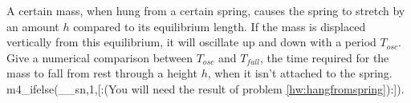         A certain mass, when hung from a certain spring, causes the spring to stretch
        by an amount $h$ compared to its equilibrium length.
        If the mass is displaced vertically from this equilibrium, it will oscillate
        up and down with a period $T_{osc}$. Give a numerical comparison between
        $T_{osc}$ and $T_{fall}$, the time required for the mass to fall from rest
        through a height $h$, when it isn't attached to the spring.
        m4_ifelse(__sn,1,[:(You will need
        the result of problem \ref{hw:hangfromspring}):]).\answercheck
